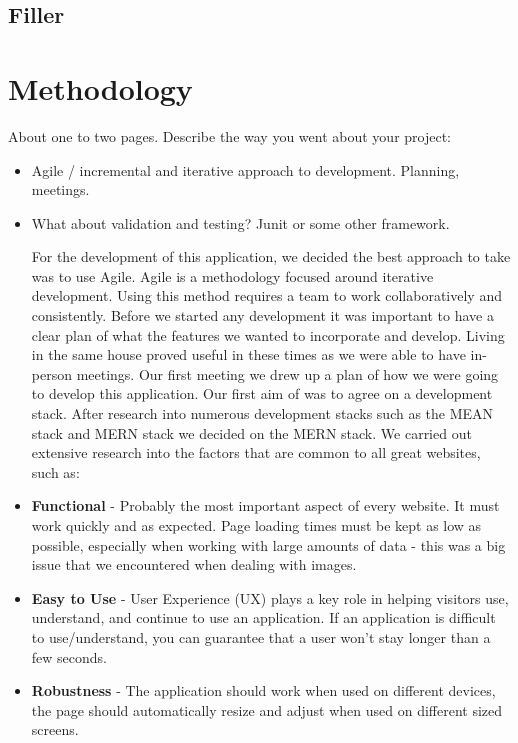 \section{Filler}


\chapter{Methodology}
About one to two pages.
Describe the way you went about your project:
\begin{itemize}
\item Agile / incremental and iterative approach to development. Planning, meetings.
\item What about validation and testing? Junit or some other framework.


For the development of this application, we decided the best approach to take was to use Agile. Agile is a methodology focused around iterative development. Using this method requires a team to work collaboratively and consistently. Before we started any development it was important to have a clear plan of what the features we wanted to incorporate and develop. Living in the same house proved useful in these times as we were able to have in-person meetings. Our first meeting we drew up a plan of how we were going to develop this application. Our first aim of was to agree on a development stack. After research into numerous development stacks such as the MEAN stack and MERN stack we decided on the MERN stack. We carried out extensive research into the factors that are common to all great websites, such as:

\item \textbf{Functional} - Probably the most important aspect of every website. It must work quickly and as expected. Page loading times must be kept as low as possible, especially when working with large amounts of data - this was a big issue that we encountered when dealing with images.
\item \textbf{Easy to Use} - User Experience (UX) plays a key role in helping visitors use, understand, and continue to use an application. If an application is difficult to use/understand, you can guarantee that a user won't stay longer than a few seconds.
\item \textbf{Robustness} - The application should work when used on different devices, the page should automatically resize and adjust when used on different sized screens.


\end{itemize}
